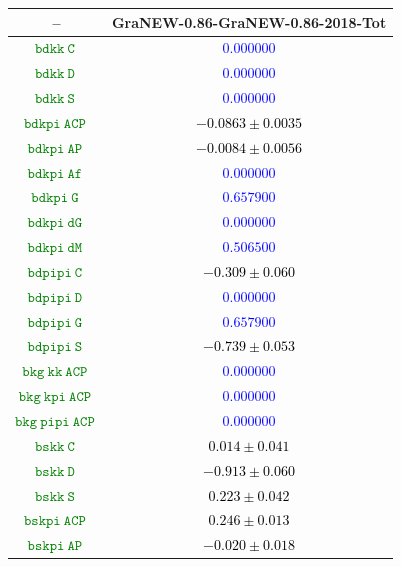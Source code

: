 \documentclass[10pt,a4paper]{article}
\begin{document}
\begin{table}[h!]
\centering
\begin{tabular}{cc}
\hline
 \textbf{--} & \textbf{GraNEW-0.86-GraNEW-0.86-2018-Tot}\\
\hline
\textcolor{Green}{$\mathtt{bdkk~C~}$} & \textcolor{blue}{$0.000000$}\\
\textcolor{Green}{$\mathtt{bdkk~D~}$} & \textcolor{blue}{$0.000000$}\\
\textcolor{Green}{$\mathtt{bdkk~S~}$} & \textcolor{blue}{$0.000000$}\\
\textcolor{Green}{$\mathtt{bdkpi~ACP~}$} & \textcolor{black}{$-0.0863 \pm 0.0035$}\\
\textcolor{Green}{$\mathtt{bdkpi~AP~}$} & \textcolor{black}{$-0.0084 \pm 0.0056$}\\
\textcolor{Green}{$\mathtt{bdkpi~Af~}$} & \textcolor{blue}{$0.000000$}\\
\textcolor{Green}{$\mathtt{bdkpi~G~}$} & \textcolor{blue}{$0.657900$}\\
\textcolor{Green}{$\mathtt{bdkpi~dG~}$} & \textcolor{blue}{$0.000000$}\\
\textcolor{Green}{$\mathtt{bdkpi~dM~}$} & \textcolor{blue}{$0.506500$}\\
\textcolor{Green}{$\mathtt{bdpipi~C~}$} & \textcolor{black}{$-0.309 \pm 0.060$}\\
\textcolor{Green}{$\mathtt{bdpipi~D~}$} & \textcolor{blue}{$0.000000$}\\
\textcolor{Green}{$\mathtt{bdpipi~G~}$} & \textcolor{blue}{$0.657900$}\\
\textcolor{Green}{$\mathtt{bdpipi~S~}$} & \textcolor{black}{$-0.739 \pm 0.053$}\\
\textcolor{Green}{$\mathtt{bkg~kk~ACP~}$} & \textcolor{blue}{$0.000000$}\\
\textcolor{Green}{$\mathtt{bkg~kpi~ACP~}$} & \textcolor{blue}{$0.000000$}\\
\textcolor{Green}{$\mathtt{bkg~pipi~ACP~}$} & \textcolor{blue}{$0.000000$}\\
\textcolor{Green}{$\mathtt{bskk~C~}$} & \textcolor{black}{$0.014 \pm 0.041$}\\
\textcolor{Green}{$\mathtt{bskk~D~}$} & \textcolor{black}{$-0.913 \pm 0.060$}\\
\textcolor{Green}{$\mathtt{bskk~S~}$} & \textcolor{black}{$0.223 \pm 0.042$}\\
\textcolor{Green}{$\mathtt{bskpi~ACP~}$} & \textcolor{black}{$0.246 \pm 0.013$}\\
\textcolor{Green}{$\mathtt{bskpi~AP~}$} & \textcolor{black}{$-0.020 \pm 0.018$}\\

\end{tabular}
\end{table}
\end{document}
